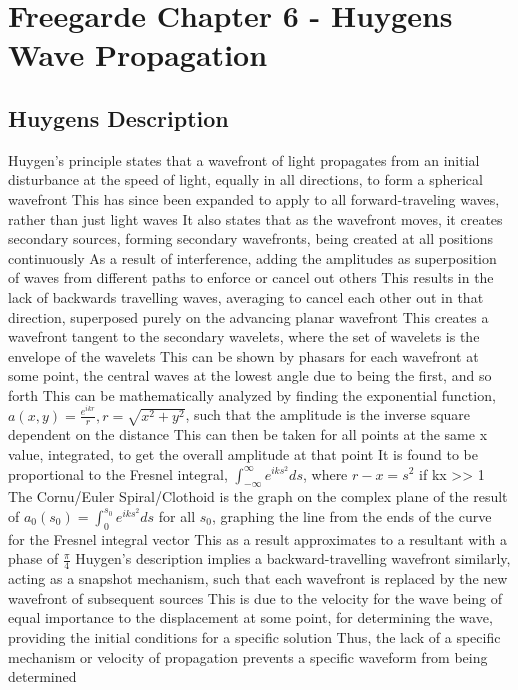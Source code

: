\documentclass[11 pt, twoside]{article}
\newenvironment{outline*}
{
	\begin{outline}[enumerate]
	}
	{\end{outline}
}
\begin{document}
\section{Freegarde Chapter 6 - Huygens Wave Propagation}
\subsection{Huygens Description}
\begin{outline*}
\1 Huygen's principle states that a wavefront of light propagates from an initial disturbance at the speed of light, equally in all directions, to form a spherical wavefront
\2 This has since been expanded to apply to all forward-traveling waves, rather than just light waves
\2 It also states that as the wavefront moves, it creates secondary sources, forming secondary wavefronts, being created at all positions continuously
\2 As a result of interference, adding the amplitudes as superposition of waves from different paths to enforce or cancel out others
\3 This results in the lack of backwards travelling waves, averaging to cancel each other out in that direction, superposed purely on the advancing planar wavefront
\4 This creates a wavefront tangent to the secondary wavelets, where the set of wavelets is the envelope of the wavelets
\3 This can be shown by phasars for each wavefront at some point, the central waves at the lowest angle due to being the first, and so forth
\4 This can be mathematically analyzed by finding the exponential function, $a(x, y) = \frac{e^{ikr}}{r}, r = \sqrt{x^2 + y^2}$, such that the amplitude is the inverse square dependent on the distance
\4 This can then be taken for all points at the same x value, integrated, to get the overall amplitude at that point
\4 It is found to be proportional to the Fresnel integral, $\int^\infty_{-\infty} e^{iks^2}ds$, where $r - x = s^2$ if kx >> 1
\4 The Cornu/Euler Spiral/Clothoid is the graph on the complex plane of the result of $a_0(s_0) = \int^{s_0}_0 e^{iks^2}ds$ for all $s_0$, graphing the line from the ends of the curve for the Fresnel integral vector
\4 This as a result approximates to a resultant with a phase of $\frac{\pi}{4}$
\3 Huygen's description implies a backward-travelling wavefront similarly, acting as a snapshot mechanism, such that each wavefront is replaced by the new wavefront of subsequent sources
\4 This is due to the velocity for the wave being of equal importance to the displacement at some point, for determining the wave, providing the initial conditions for a specific solution
\4 Thus, the lack of a specific mechanism or velocity of propagation prevents a specific waveform from being determined

\end{outline*}
\end{document}
